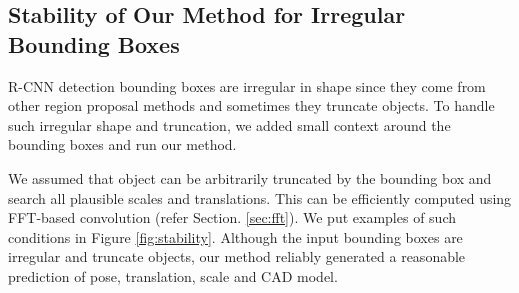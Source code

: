 \documentclass[10pt,twocolumn,letterpaper]{article}
\begin{document}
\subsection{Stability of Our Method for Irregular Bounding Boxes}


R-CNN detection bounding boxes are irregular in shape since they come from other region proposal methods and sometimes they truncate objects. To handle such irregular shape and truncation, we added small context around the bounding boxes and run our method. 

We assumed that object can be arbitrarily truncated by the bounding box and search all plausible scales and translations. This can be efficiently computed using FFT-based convolution (refer Section. \ref{sec:fft}). We put examples of such conditions in Figure \ref{fig:stability}. Although the input bounding boxes are irregular and truncate objects, our method reliably generated a reasonable prediction of pose, translation, scale and CAD model.

\end{document}
